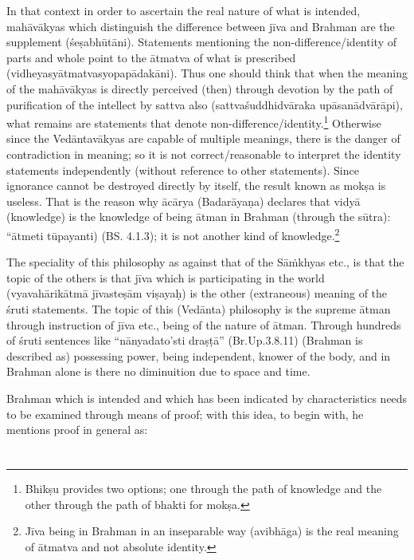 In that context in order to ascertain the real nature of what is intended, mahāvākyas which distinguish the difference between jīva and Brahman are the supplement (śeṣabhūtāni). Statements mentioning the non-difference/identity of parts and whole point to the ātmatva of what is prescribed (vidheyasyātmatvasyopapādakāni). Thus one should think that when the meaning of the mahāvākyas is directly perceived (then) through devotion by the path of purification of the intellect by sattva also (sattvaśuddhidvāraka upāsanādvārāpi),  what remains are statements that denote non-difference/identity.\footnote{Bhikṣu provides two options; one through the path of knowledge and the other through the path of bhakti for mokṣa.} Otherwise since the Vedāntavākyas are capable of multiple meanings, there is the danger of contradiction in meaning; so it is not correct/reasonable to interpret the identity statements independently (without reference to other statements). Since ignorance cannot be destroyed directly by itself, the result known as mokṣa is useless. That is the reason why ācārya (Badarāyaṇa) declares that vidyā (knowledge) is the knowledge of being ātman in Brahman (through the sūtra): “ātmeti tūpayanti) (BS. 4.1.3); it is not another kind of knowledge.\footnote{Jīva being in Brahman in an inseparable way (avibhāga) is the real meaning of ātmatva and not absolute identity.} 

The speciality of this philosophy as against that of the Sāṁkhyas etc., is that the topic of the others is that jīva which is participating in the world (vyavahārikātmā jīvasteṣām viṣayaḥ) is the other (extraneous) meaning of the śruti statements. The topic of this (Vedānta) philosophy is the supreme ātman through instruction of jīva etc., being of the nature of ātman. Through hundreds of śruti sentences like “nānyadato’sti draṣṭā” (Br.Up.3.8.11) (Brahman is described as) possessing power, being independent, knower of the body, and in Brahman alone is there no diminuition due to space and time.

Brahman which is intended and which has been indicated by characteristics needs to be examined through means of proof; with this idea, to begin with, he mentions proof in general as:

\section*{}

